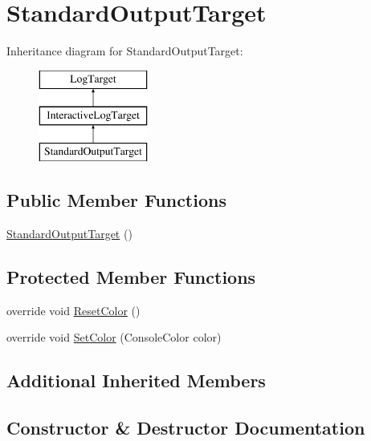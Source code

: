 \hypertarget{classOTA_1_1Logging_1_1StandardOutputTarget}{}\section{Standard\+Output\+Target}
\label{classOTA_1_1Logging_1_1StandardOutputTarget}
Inheritance diagram for Standard\+Output\+Target\+:\begin{figure}[H]
\begin{center}
\leavevmode
\includegraphics[height=3.000000cm]{classOTA_1_1Logging_1_1StandardOutputTarget}
\end{center}
\end{figure}
\subsection*{Public Member Functions}
\begin{DoxyCompactItemize}
\item 
\hyperlink{classOTA_1_1Logging_1_1StandardOutputTarget_ada21313553ee30ef47a78b99568da190}{Standard\+Output\+Target} ()
\end{DoxyCompactItemize}
\subsection*{Protected Member Functions}
\begin{DoxyCompactItemize}
\item 
override void \hyperlink{classOTA_1_1Logging_1_1StandardOutputTarget_a160381b37add18d5d439e2993a85253c}{Reset\+Color} ()
\item 
override void \hyperlink{classOTA_1_1Logging_1_1StandardOutputTarget_a3de5502cb52b348c3fa04d081342cceb}{Set\+Color} (Console\+Color color)
\end{DoxyCompactItemize}
\subsection*{Additional Inherited Members}


\subsection{Constructor \& Destructor Documentation}
\hypertarget{classOTA_1_1Logging_1_1StandardOutputTarget_ada21313553ee30ef47a78b99568da190}{}
